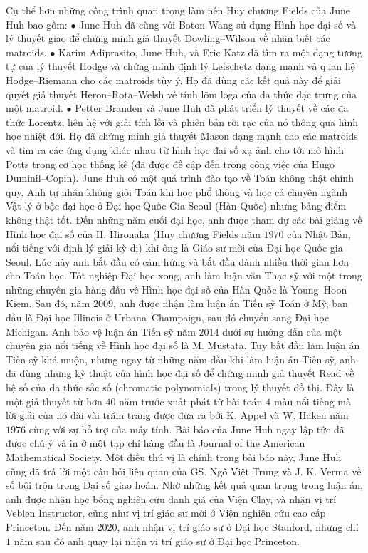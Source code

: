 \begin{multicols}{2}
	\vskip 0.05cm
	Cụ thể hơn những công trình quan trọng làm nên Huy chương Fields của June Huh bao gồm:
	\vskip 0.05cm
	$\bullet$ June Huh đã cùng với Boton Wang sử dụng Hình học đại số và lý thuyết giao để chứng minh giả thuyết Dowling--Wilson về nhận biết các matroids. 
	\vskip 0.05cm
	$\bullet$ Karim Adiprasito, June Huh, và Eric Katz đã tìm ra một dạng tương tự của lý thuyết Hodge và chứng minh định lý Lefschetz dạng mạnh và quan hệ Hodge--Riemann cho các matroids tùy ý. Họ đã dùng các kết quả này để giải quyết giả thuyết Heron--Rota--Welsh về tính lõm loga của đa thức đặc trưng của một matroid. 
	\vskip 0.05cm
	$\bullet$ Petter Branden và June Huh đã phát triển lý thuyết về các đa thức Lorentz, liên hệ với giải tích lồi và phiên bản rời rạc của nó thông qua hình học nhiệt đới. Họ đã chứng minh giả thuyết Mason dạng mạnh cho các matroids và tìm ra các ứng dụng khác nhau từ hình học đại số xạ ảnh cho tới mô hình Potts trong cơ học thống kê (đã được đề cập đến trong công việc của Hugo Duminil--Copin).
	\vskip 0.05cm 
	June Huh có một quá trình đào tạo về Toán không thật chính quy. Anh tự nhận không giỏi Toán khi học phổ thông và học cả chuyên ngành Vật lý ở bậc đại học ở Đại học Quốc Gia Seoul (Hàn Quốc) nhưng bảng điểm không thật tốt. Đến những năm cuối đại học, anh được tham dự các bài giảng về Hình học đại số của H. Hironaka (Huy chương Fields năm $1970$ của Nhật Bản, nổi tiếng với định lý giải kỳ dị) khi ông là Giáo sư mời của Đại học Quốc gia Seoul. Lúc này anh bắt đầu có cảm hứng và bắt đầu dành nhiều thời gian hơn cho Toán học. Tốt nghiệp Đại học xong, anh làm luận văn Thạc sỹ với một trong những chuyên gia hàng đầu về Hình học đại số của Hàn Quốc là Young--Hoon Kiem. Sau đó, năm $2009$, anh được nhận làm luận án Tiến sỹ Toán ở Mỹ, ban đầu là Đại học Illinois ở Urbana--Champaign, sau đó chuyển sang Đại học Michigan. Anh bảo vệ luận án Tiến sỹ năm $2014$ dưới sự hướng dẫn của một chuyên gia nổi tiếng về Hình học đại số là M. Mustata. Tuy bắt đầu làm luận án Tiến sỹ khá muộn, nhưng ngay từ những năm đầu khi làm luận án Tiến sỹ, anh đã dùng những kỹ thuật của hình học đại số để chứng minh giả thuyết Read về hệ số của đa thức sắc số (chromatic polynomials) trong lý thuyết đồ thị. Đây là một giả thuyết từ hơn $40$ năm trước xuất phát từ bài toán $4$ màu nổi tiếng mà lời giải của nó dài vài trăm trang được đưa ra bởi K. Appel và W. Haken năm $1976$ cùng với sự hỗ trợ của máy tính. Bài báo của June Huh ngay lập tức đã được chú ý và in ở một tạp chí hàng đầu là Journal of the American Mathematical Society. Một điều thú vị là chính trong bài báo này, June Huh cũng đã trả lời một câu hỏi liên quan của GS. Ngô Việt Trung và J. K. Verma về số bội trộn trong Đại số giao hoán. Nhờ những kết quả quan trọng trong luận án, anh được nhận học bổng nghiên cứu danh giá của Viện Clay, và nhận vị trí Veblen Instructor, cũng như vị trí giáo sư mời ở Viện nghiên cứu cao cấp Princeton. Đến năm $2020$, anh nhận vị trí giáo sư ở Đại học Stanford, nhưng chỉ $1$ năm sau đó anh quay lại nhận vị trí giáo sư ở Đại học Princeton.     

\end{multicols}
